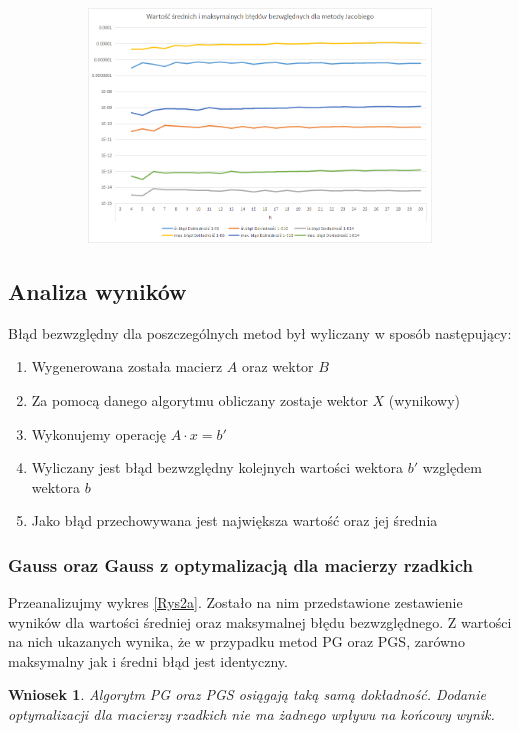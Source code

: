\documentclass[10pt]{article}
\newtheorem{wn}{Wniosek}
\begin{document}
\begin{figure}[h]
\begin{subfigure}{0.5\textwidth}
	\includegraphics[width=\textwidth]{4.png}
	\caption{ \label{Rys2c}}
	\end{subfigure}
\end{figure}
\subsection{Analiza wyników}
Błąd bezwzględny dla poszczególnych metod był wyliczany w sposób następujący:
\begin{enumerate}
	\item Wygenerowana została macierz $A$ oraz wektor $B$
	\item Za pomocą danego algorytmu obliczany zostaje wektor $X$ (wynikowy)
	\item Wykonujemy operację $A\cdot x = b'$
	\item Wyliczany jest błąd bezwzględny kolejnych wartości wektora $b'$ względem wektora $b$
	\item Jako błąd przechowywana jest największa wartość oraz jej średnia
\end{enumerate}
\subsubsection{Gauss oraz Gauss z optymalizacją dla macierzy rzadkich}
Przeanalizujmy wykres \ref{Rys2a}. Zostało na nim przedstawione zestawienie wyników dla wartości średniej oraz maksymalnej błędu bezwzględnego. Z wartości na nich ukazanych wynika, że w przypadku metod PG oraz PGS, zarówno maksymalny jak i średni błąd jest identyczny.
\begin{wn}
	Algorytm PG oraz PGS osiągają taką samą dokładność. Dodanie optymalizacji dla macierzy rzadkich nie ma żadnego wpływu na końcowy wynik.\label{wn:1}
\end{wn}
\end{document}
